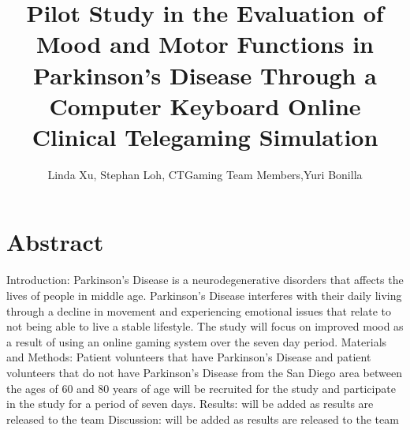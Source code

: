 \documentclass[12pt,letterpaper]{article}
\begin{document}
\title{Pilot Study in the Evaluation of Mood and Motor Functions in Parkinson's Disease Through a Computer Keyboard Online Clinical Telegaming Simulation}
\author{Linda Xu, Stephan Loh, CTGaming Team Members,Yuri Bonilla}
\maketitle
 
\section{Abstract}
 Introduction: Parkinson's Disease is a neurodegenerative disorders that affects the lives of people in middle age. Parkinson's Disease interferes with their daily living through a decline in movement and experiencing emotional issues that relate to not being able to live a stable lifestyle. The study will focus on improved mood as a result of using an online gaming system over the seven day period. 
 Materials and Methods: Patient volunteers that have Parkinson's Disease and patient volunteers that do not have Parkinson's Disease from the San Diego area between the ages of 60 and 80 years of age will be recruited for the study and participate in the study for a period of seven days. 
 Results: will be added as results are released to the team
 Discussion: will be added as results are released to the team
 
\end{document}
